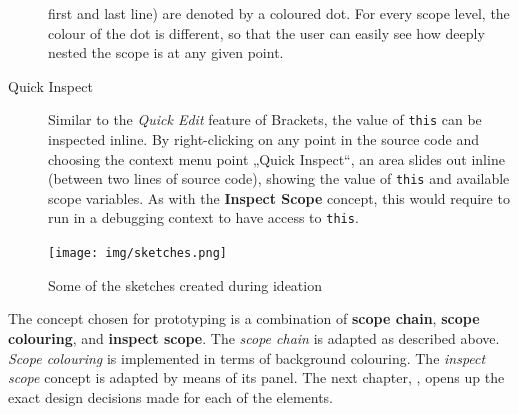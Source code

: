 \begin{description}
first and last line) are denoted by a coloured dot. For every scope
level, the colour of the dot is different, so that the user can easily
see how deeply nested the scope is at any given point.
\item[Quick Inspect]
Similar to the \emph{Quick Edit} feature of Brackets, the value of
\texttt{this} can be inspected inline. By right-clicking on any point in
the source code and choosing the context menu point „Quick Inspect“, an
area slides out inline (between two lines of source code), showing the
value of \texttt{this} and available scope variables. As with the
\textbf{Inspect Scope} concept, this would require to run in a debugging
context to have access to \texttt{this}.
\end{description}

\begin{figure}[htbp]
\centering
\texttt{[image: img/sketches.png]}
\caption{Some of the sketches created during ideation}
\label{fig:sketches1}
\end{figure}

The concept chosen for prototyping is a combination of \textbf{scope
chain}, \textbf{scope colouring}, and \textbf{inspect scope}. The
\emph{scope chain} is adapted as described above. \emph{Scope colouring}
is implemented in terms of background colouring. The \emph{inspect
scope} concept is adapted by means of its panel. The next chapter,
, opens up the exact design decisions made for each of
the elements.

